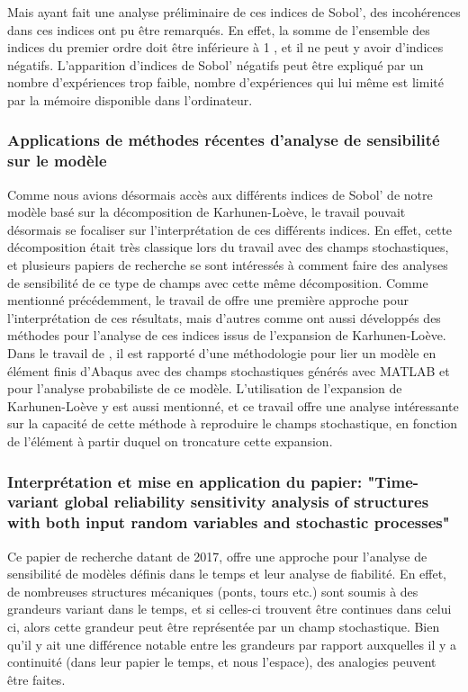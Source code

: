 \documentclass[a4paper,10pt]{article}
\begin{document}
Mais ayant fait une analyse préliminaire de ces indices de Sobol', des incohérences dans ces indices ont pu être remarqués. En effet, la somme de l'ensemble des indices du premier ordre doit être inférieure à 1 , et il ne peut y avoir d'indices négatifs. L'apparition d'indices de Sobol' négatifs peut être expliqué par un nombre d’expériences trop faible, nombre d’expériences qui lui même est limité par la mémoire disponible dans l'ordinateur.


\subsubsection{Applications de méthodes récentes d'analyse de sensibilité sur le modèle }

Comme nous avions désormais accès aux différents indices de Sobol’ de notre modèle basé sur la décomposition de Karhunen-Loève, le travail pouvait désormais se focaliser sur l'interprétation de ces différents indices. En effet, cette décomposition était très classique lors du travail avec des champs stochastiques, et plusieurs papiers de recherche se sont intéressés à comment faire des  analyses de sensibilité de ce type de champs avec cette même décomposition. Comme mentionné précédemment, le travail de \cite{Wei2017May} offre une première approche pour l’interprétation de ces résultats, mais d'autres comme \cite{Pronzato2019Jul} ont aussi développés des méthodes pour l'analyse de ces indices issus de l'expansion de Karhunen-Loève. 
Dans le travail de \cite{shangStochastic2013}, il est rapporté d'une méthodologie pour lier un modèle en élément finis d'Abaqus avec des champs stochastiques générés avec MATLAB et pour l'analyse probabiliste de ce modèle. L'utilisation de l'expansion de Karhunen-Loève y est aussi mentionné, et ce travail offre une analyse intéressante sur la capacité de cette méthode à reproduire le champs stochastique, en fonction de l'élément à partir duquel on troncature cette expansion. 



\subsubsection{Interprétation et mise en application du papier: "Time-variant global reliability sensitivity analysis of structures with both input random variables and stochastic processes"}
Ce papier de recherche datant de 2017, offre une approche pour l'analyse de sensibilité de modèles définis dans le temps et leur analyse de fiabilité. En effet, de nombreuses structures mécaniques (ponts, tours etc.) sont soumis à des grandeurs variant dans le temps, et si celles-ci trouvent être continues dans celui ci, alors cette grandeur peut être représentée par un champ stochastique. Bien qu'il y ait une différence notable entre les grandeurs par rapport auxquelles il y a continuité (dans leur papier le temps, et nous l'espace), des analogies peuvent être faites. \smallskip
\end{document}
